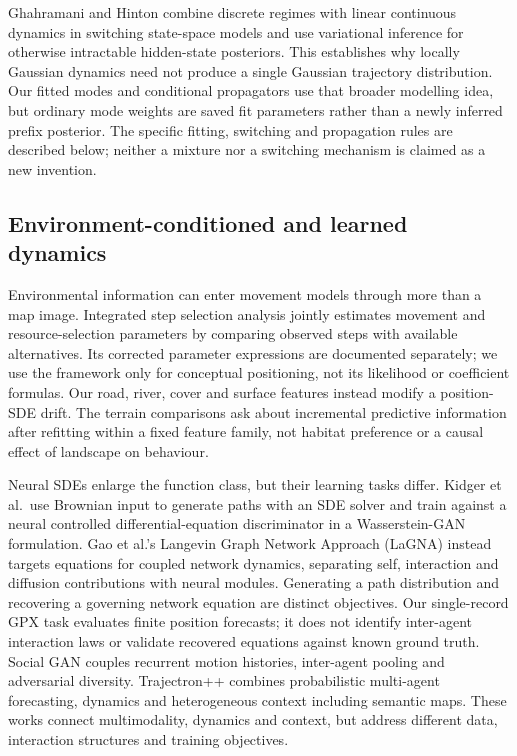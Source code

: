 \documentclass[11pt]{article}
\begin{document}
Ghahramani and Hinton combine discrete regimes with linear continuous
dynamics in switching state-space models and use variational inference for
otherwise intractable hidden-state posteriors\cite{ghahramani2000}.
This establishes why locally Gaussian dynamics need not produce a single
Gaussian trajectory distribution. Our fitted modes and conditional
propagators use that broader modelling idea, but ordinary mode weights are
saved fit parameters rather than a newly inferred prefix posterior. The
specific fitting, switching and propagation rules are described below;
neither a mixture nor a switching mechanism is claimed as a new invention.

\subsection{Environment-conditioned and learned dynamics}
Environmental information can enter movement models through more than a
map image. Integrated step selection analysis jointly estimates movement
and resource-selection parameters by comparing observed steps with
available alternatives\cite{avgar2016}. Its corrected parameter expressions
are documented separately\cite{avgar2017correction}; we use the framework
only for conceptual positioning, not its likelihood or coefficient formulas.
Our road, river, cover and surface features instead modify a position-SDE
drift. The terrain comparisons ask about incremental predictive information
after refitting within a fixed feature family, not habitat preference or a
causal effect of landscape on behaviour.

Neural SDEs enlarge the function class, but their learning tasks differ.
Kidger et al.\ use Brownian input to generate paths with an SDE solver and
train against a neural controlled differential-equation discriminator in
a Wasserstein-GAN formulation\cite{kidger2021}. Gao et al.'s Langevin Graph
Network Approach (LaGNA) instead targets equations for coupled network
dynamics, separating self, interaction and diffusion contributions with
neural modules\cite{gao2024}. Generating a path distribution and recovering
a governing network equation are distinct objectives. Our single-record
GPX task evaluates finite position forecasts; it does not identify
inter-agent interaction laws or validate recovered equations against known
ground truth. Social GAN couples recurrent motion histories,
inter-agent pooling and adversarial diversity\cite{gupta2018}.
Trajectron++ combines probabilistic multi-agent forecasting, dynamics and
heterogeneous context including semantic maps\cite{salzmann2020}.
These works connect multimodality, dynamics and context, but address
different data, interaction structures and training objectives.
\end{document}
